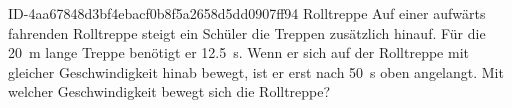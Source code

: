 \begin{exercise}
      {ID-4aa67848d3bf4ebacf0b8f5a2658d5dd0907ff94}
      {Rolltreppe}
  \ifproblem\problem
    Auf einer aufwärts fahrenden Rolltreppe steigt ein Schüler die Treppen
    zusätzlich hinauf. Für die \SI{20}{\metre} lange Treppe benötigt er
    \SI{12.5}{\second}. Wenn er sich auf der Rolltreppe mit gleicher
    Geschwindigkeit hinab bewegt, ist er erst nach \SI{50}{\second} oben
    angelangt. Mit welcher Geschwindigkeit bewegt sich die Rolltreppe?
  \fi
\end{exercise}
